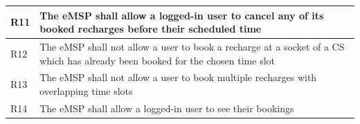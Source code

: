 \documentclass[11pt]{article}
\begin{document}
\begin{table}[H]
\begin{tabularx}{\textwidth}{|>{\centering\hsize=0.1\hsize}X|>{\hsize=1.9\hsize}X|}
        R11 & The eMSP shall allow a logged-in user to cancel any of its booked recharges before their scheduled time \\
        \hline
        R12 & The eMSP shall not allow a user to book a recharge at a socket of a CS which has already been booked for the chosen time slot \\
        \hline
        R13 & The eMSP shall not allow a user to book multiple recharges with overlapping time slots \\
        \hline
        R14 & The eMSP shall allow a logged-in user to see their bookings \\
        \hline
    \end{tabularx}
    \label{tab:requirements}
\end{table}
\end{document}
